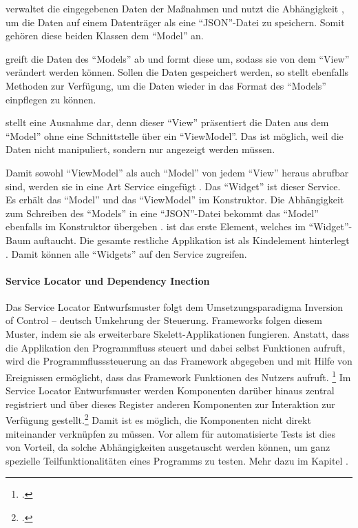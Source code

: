   verwaltet die eingegebenen Daten der Maßnahmen und nutzt die Abhängigkeit  , um die Daten auf einem Datenträger als eine \enquote{JSON}-Datei zu speichern.
Somit gehören diese beiden Klassen dem \enquote{Model} an.

  greift die Daten des \enquote{Models} ab und formt diese um, sodass sie von dem \enquote{View}   verändert werden können.
Sollen die Daten gespeichert werden, so stellt  ebenfalls Methoden zur Verfügung, um die Daten wieder in das Format des \enquote{Models} einpflegen zu können.

  stellt eine Ausnahme dar, denn dieser \enquote{View} präsentiert die Daten aus dem \enquote{Model} ohne eine Schnittstelle über ein \enquote{ViewModel}.
Das ist möglich, weil die Daten nicht manipuliert, sondern nur angezeigt werden müssen.

Damit sowohl \enquote{ViewModel} als auch \enquote{Model} von jedem \enquote{View} heraus abrufbar sind, werden sie in eine Art Service eingefügt .
Das \enquote{Widget}  ist dieser Service.
 Es erhält das \enquote{Model}  und das \enquote{ViewModel}   im Konstruktor.
Die Abhängigkeit zum Schreiben des \enquote{Models} in eine \enquote{JSON}-Datei  bekommt das \enquote{Model} ebenfalls im Konstruktor übergeben .
 ist das erste Element, welches im \enquote{Widget}-Baum auftaucht.
Die gesamte restliche Applikation ist als Kindelement hinterlegt .
Damit können alle \enquote{Widgets} auf den Service zugreifen.


\paragraph{Service Locator und Dependency Inection}

Das Service Locator Entwurfsmuster folgt dem Umsetzungsparadigma Inversion of Control -- deutsch Umkehrung der Steuerung.
Frameworks folgen diesem Muster, indem sie als erweiterbare Skelett-Applikationen fungieren.
Anstatt, dass die Applikation den Programmfluss steuert und dabei selbst Funktionen aufruft, wird die Programmflusssteuerung an das Framework abgegeben und mit Hilfe von Ereignissen ermöglicht, dass das Framework Funktionen des Nutzers aufruft.
\footcite[Vgl.][]{johnson1988designing}
Im Service Locator Entwurfsmuster werden Komponenten darüber hinaus zentral registriert und über dieses Register anderen Komponenten zur Interaktion zur Verfügung gestellt.\footcite[Vgl.][]{fowler2004DependencyInjection}
Damit ist es möglich, die Komponenten nicht direkt miteinander verknüpfen zu müssen.
Vor allem für automatisierte Tests ist dies von Vorteil, da solche Abhängigkeiten ausgetauscht werden können, um ganz spezielle Teilfunktionalitäten eines Programms zu testen.
 Mehr dazu im Kapitel .


